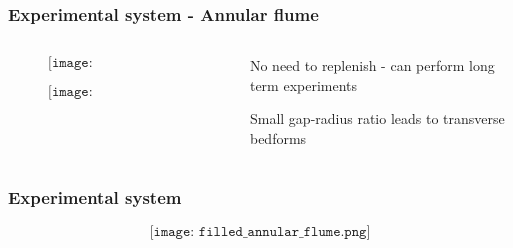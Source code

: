 \documentclass{beamer}
\begin{document}
\begin{frame}
  \frametitle{Experimental system - Annular flume}

  \begin{columns}[t]

    \begin{column}{0.5\paperwidth}

      \vspace{-1.8cm}

      \begin{figure}
        $$\texttt{[image: annular\_flume.png]}$$
      \end{figure}

      \vspace{-1.8cm}

      \begin{figure}
        $$\texttt{[image: filled\_annular\_flume.png]}$$
      \end{figure}

    \end{column}

    \begin{column}{0.5\paperwidth}

      No need to replenish - can perform long term experiments

      \vspace{1cm}

      Small gap-radius ratio leads to transverse bedforms

    \end{column}

  \end{columns}
\end{frame}

\begin{frame}
  \frametitle{Experimental system}

  \begin{figure}
    $$\texttt{[image: filled\_annular\_flume.png]}$$
  \end{figure}


\end{frame}
\end{document}

